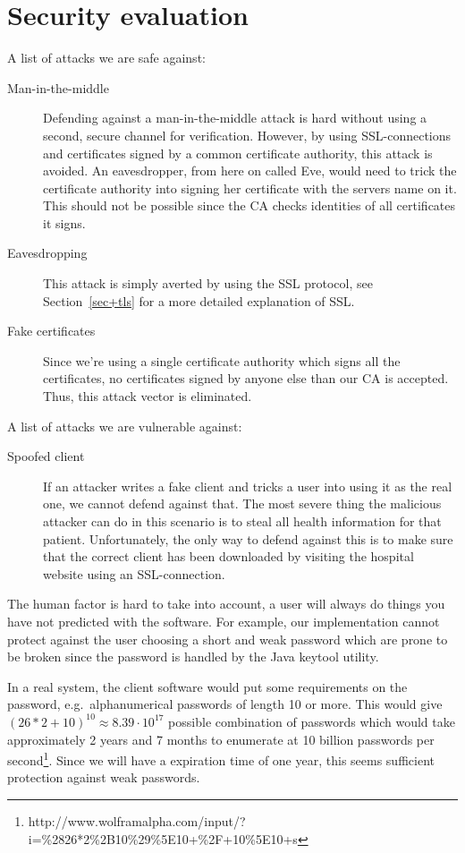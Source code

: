\documentclass[10pt, a4paper]{article}
\begin{document}
\section{Security evaluation}
A list of attacks we are safe against:
\begin{description}
\item[Man-in-the-middle] Defending against a man-in-the-middle attack is hard without using a second, secure channel for verification. However, by using SSL-connections and certificates signed by a common certificate authority, this attack is avoided. An eavesdropper, from here on called Eve, would need to trick the certificate authority into signing her certificate with the servers name on it. This should not be possible since the CA checks identities of all certificates it signs.
\item[Eavesdropping] This attack is simply averted by using the SSL protocol, see Section~\ref{sec+tls} for a more detailed explanation of SSL.
\item[Fake certificates] Since we're using a single certificate authority which signs all the certificates, no certificates signed by anyone else than our CA is accepted. Thus, this attack vector is eliminated.
\end{description}

A list of attacks we are vulnerable against:
\begin{description}
\item[Spoofed client] If an attacker writes a fake client and tricks a user into using it as the real one, we cannot defend against that. The most severe thing the malicious attacker can do in this scenario is to steal all health information for that patient. Unfortunately, the only way to defend against this is to make sure that the correct client has been downloaded by visiting the hospital website using an SSL-connection.
\item[]
\end{description}

The human factor is hard to take into account, a user will always do things you have not predicted with the software. For example, our implementation cannot protect against the user choosing a short and weak password which are prone to be broken since the password is handled by the Java keytool utility.

In a real system, the client software would put some requirements on the password, e.g.~alphanumerical passwords of length 10 or more. This would give $(26*2 + 10)^{10} \approx 8.39\cdot 10^{17}$ possible combination of passwords which would take approximately 2 years and 7 months to enumerate at 10 billion passwords per second\footnote{http://www.wolframalpha.com/input/?i=\%2826*2\%2B10\%29\%5E10+\%2F+10\%5E10+s}. Since we will have a expiration time of one year, this seems sufficient protection against weak passwords.
\end{document}
